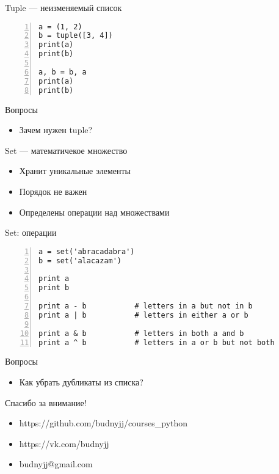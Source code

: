 \documentclass[hyperref={pdftex,unicode}]{beamer}
\begin{document}
\begin{frame}[fragile]{Tuple --- неизменяемый список}
  \begin{lstlisting}[basicstyle=\footnotesize\ttfamily,numbers=left]
a = (1, 2)
b = tuple([3, 4])
print(a)
print(b)

a, b = b, a
print(a)
print(b)
  \end{lstlisting}
\end{frame}

\begin{frame}{Вопросы}
  \begin{itemize}
  \item Зачем нужен tuple?
  \end{itemize}
\end{frame}

\begin{frame}{Set --- математичекое множество}
  \begin{itemize}
  \item Хранит уникальные элементы
  \item Порядок не важен
  \item Определены операции над множествами
  \end{itemize}
\end{frame}

\begin{frame}[fragile]{Set: операции}
\begin{lstlisting}[basicstyle=\footnotesize\ttfamily,numbers=left]
a = set('abracadabra')
b = set('alacazam')

print a
print b

print a - b           # letters in a but not in b
print a | b           # letters in either a or b

print a & b           # letters in both a and b
print a ^ b           # letters in a or b but not both
\end{lstlisting}
\end{frame}

\begin{frame}{Вопросы}
  \begin{itemize}
  \item Как убрать дубликаты из списка?
  \end{itemize}
\end{frame}

\begin{frame}{Спасибо за внимание!}
  \begin{itemize}
  \item https://github.com/budnyjj/courses\_python
  \item https://vk.com/budnyjj
  \item budnyjj@gmail.com
  \end{itemize}
\end{frame}
\end{document}
